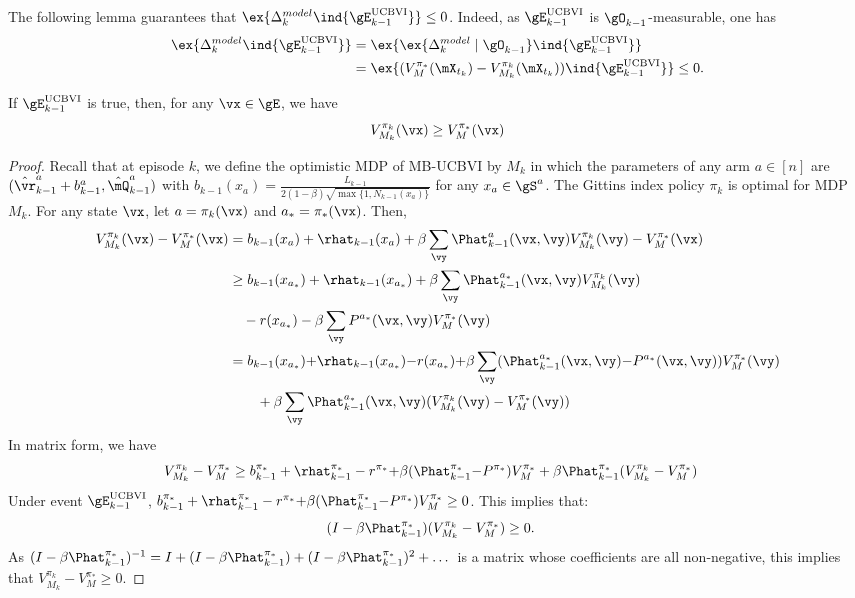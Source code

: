 The following lemma guarantees that $\ex{\Delta^{model}_k \ind{\gE_{k-1}^\text{UCBVI}}}\le0$. Indeed, as $\gE_{k-1}^\text{UCBVI}$ is $\gO_{k-1}$-measurable, one has 
\begin{align*}
    \ex{\Delta^{model}_k\ind{\gE_{k-1}^\text{UCBVI}}} &= \ex{\ex{\Delta^{model}_k\mid \gO_{k-1}}\ind{\gE_{k-1}^\text{UCBVI}}}\\
    &=\ex{(V_M^{\pi_*}(\mX_{t_k}) - V_{M_k}^{\pi_k}(\mX_{t_k}))\ind{\gE_{k-1}^\text{UCBVI}}} \le 0.
\end{align*}
\begin{lem}
    \label{lem:ucbvi_optim}
   If $\gE_{k-1}^\text{UCBVI}$ is true, then, for any $\vx\in\gE$, we have
   \begin{align*}
       V_{M_k}^{\pi_k}(\vx) \ge V_{M}^{\pi_*}(\vx)
    \end{align*}
\end{lem}
\begin{proof}
    Recall that at episode $k$, we define the optimistic MDP of MB-UCBVI by $M_k$ in which the parameters of any arm $a\in[n]$ are $(\hat{\vr}_{k-1}^a +b_{k-1}^a, \hat{\mQ}_{k-1}^a)$ with $b_{k-1}(x_a){=}\frac{L_{k-1}}{2(1-\beta)\sqrt{\max\{1,N_{k-1}(x_a)\} }}$ for any $x_a\in\gS^a$.
The Gittins index policy $\pi_k$ is optimal for MDP $M_k$.
For any state $\vx$, let $a=\pi_k(\vx)$ and $a_*=\pi_*(\vx)$.
Then,
\begin{align*}
    V_{M_k}^{\pi_k}(\vx) -V_M^{\pi_*}(\vx)
    &= b_{k-1}(x_a) +\rhat_{k-1}(x_a) +\beta\sum_{\vy}\Phat_{k-1}^{a}(\vx,\vy)V_{M_k}^{\pi_k}(\vy) -V_M^{\pi_*}(\vx)\\ 
    &\ge b_{k-1}(x_{a_*}) +\rhat_{k-1}(x_{a_*}) +\beta\sum_{\vy}\Phat_{k-1}^{a_*}(\vx,\vy)V_{M_k}^{\pi_k}(\vy) \\
    &\quad -r(x_{a_*}) -\beta\sum_{\vy}P^{a_*}(\vx,\vy)V_M^{\pi_*}(\vy) \\
    &= b_{k-1}(x_{a_*}) {+}\rhat_{k-1}(x_{a_*}) {-}r(x_{a_*}) {+}\beta\sum_{\vy}(\Phat_{k-1}^{a_*}(\vx,\vy) {-}P^{a_*}(\vx,\vy))V_M^{\pi_*}(\vy) \\
    &\qquad +\beta \sum_{\vy}\Phat_{k-1}^{a_*}(\vx,\vy)(V_{M_k}^{\pi_k}(\vy) -V_M^{\pi_*}(\vy))
\end{align*}
In matrix form, we have
\begin{align*}
    V_{M_k}^{\pi_k} -V_M^{\pi_*}
    &\ge b_{k-1}^{\pi_*} +\rhat^{\pi_*}_{k-1} -r^{\pi_*} {+}\beta(\Phat_{k-1}^{\pi_*} {-}P^{\pi_*})V_M^{\pi_*} +\beta \Phat_{k-1}^{\pi_*}(V_{M_k}^{\pi_k} -V_M^{\pi_*})
\end{align*}
Under event $\gE_{k-1}^\text{UCBVI}$, $b_{k-1}^{\pi_*} +\rhat^{\pi_*}_{k-1} -r^{\pi_*} {+}\beta(\Phat_{k-1}^{\pi_*} {-}P^{\pi_*})V_M^{\pi_*}\ge 0$. This implies that:
\begin{align*}
    (I-\beta \Phat_{k-1}^{\pi_*})(V_{M_k}^{\pi_k} -V_M^{\pi_*}) &\ge 0.
\end{align*}
As $(I-\beta \Phat_{k-1}^{\pi_*})^{-1} = I+ (I-\beta \Phat_{k-1}^{\pi_*}) +(I-\beta \Phat_{k-1}^{\pi_*})^2 +\dots$ is a matrix whose coefficients are all non-negative, this implies that $V_{M_k}^{\pi_k} -V_M^{\pi_*} \ge 0$. 
\end{proof}

